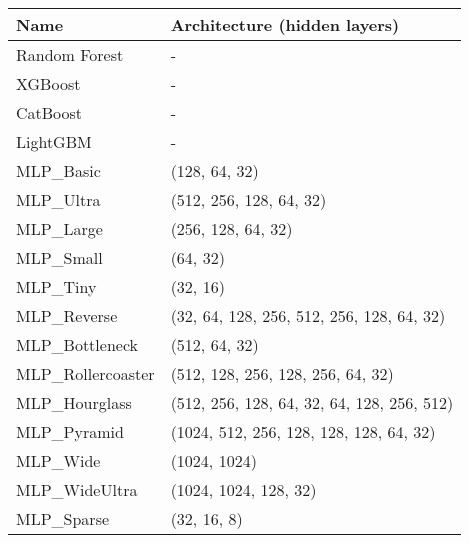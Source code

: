 \begin{table}[h!]
    \centering
    \footnotesize
    \begin{tabular}{|l|l|}
        \hline
        \textbf{Name}           & \textbf{Architecture (hidden layers)}                                 \\ \hline
	   Random Forest                 & -                                                     \\ \hline
        XGBoost                 & -                                                     \\ \hline
        CatBoost                & -                                                     \\ \hline
        LightGBM                & -                                                     \\ \hline
        MLP\_Basic              & (128, 64, 32)                                         \\ \hline
        MLP\_Ultra              & (512, 256, 128, 64, 32)                               \\ \hline
        MLP\_Large              & (256, 128, 64, 32)                                    \\ \hline
        MLP\_Small              & (64, 32)                                              \\ \hline
        MLP\_Tiny               & (32, 16)                                              \\ \hline
        MLP\_Reverse            & (32, 64, 128, 256, 512, 256, 128, 64, 32)             \\ \hline
        MLP\_Bottleneck         & (512, 64, 32)                                         \\ \hline
        MLP\_Rollercoaster      & (512, 128, 256, 128, 256, 64, 32)                     \\ \hline
        MLP\_Hourglass          & (512, 256, 128, 64, 32, 64, 128, 256, 512)            \\ \hline
        MLP\_Pyramid            & (1024, 512, 256, 128, 128, 128, 64, 32)               \\ \hline
        MLP\_Wide               & (1024, 1024)                                          \\ \hline
        MLP\_WideUltra          & (1024, 1024, 128, 32)                                 \\ \hline
        MLP\_Sparse             & (32, 16, 8)                                           \\ \hline

\end{tabular}
\end{table}
